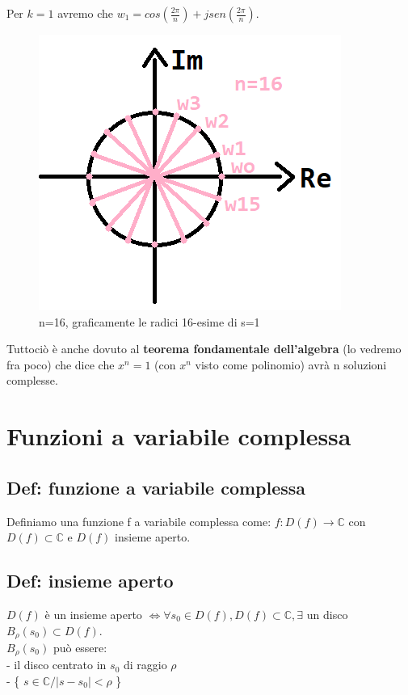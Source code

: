 Per $ k = 1$ avremo che $ w_{1} = cos(\frac{2 \pi}{n}) + j sen( \frac{2 \pi}{n}) $.\\

\begin{figure}[h]
	\centering
	\includegraphics[scale=0.5]{immagini/esempioSUnitario}
	\caption{ n=16, graficamente le radici 16-esime di s=1 }
	\label{fig: esempioRadiciSUNitario}
\end{figure}

Tuttociò è anche dovuto al \textbf{teorema fondamentale dell'algebra} (lo vedremo fra poco) che dice che $ x^{n} = 1$ (con $ x^{n}$ visto come polinomio) avrà n soluzioni complesse. \\

\pagebreak

\section{ Funzioni a variabile complessa }

\subsection*{Def: funzione a variabile complessa}
Definiamo una funzione f a variabile complessa come:
$ f: D(f) \longrightarrow \mathbb{C} $ con $ D(f)\subset \mathbb{C} $ e $ D(f) $ insieme aperto.

\subsection*{Def: insieme aperto}
$ D(f) $ è un insieme aperto $ \Leftrightarrow \forall s_{0} \in D(f) , D(f)\subset \mathbb{C} , \exists $ un disco $ B_{\rho}(s_{0}) \subset D(f)$. \\
$ B_{\rho}(s_{0})$ può essere:\\
- il disco centrato in $ s_{0}$ di raggio $ \rho $\\
- \{ $ s \in \mathbb{C} / |s-s_{0}| < \rho $ \}\\

